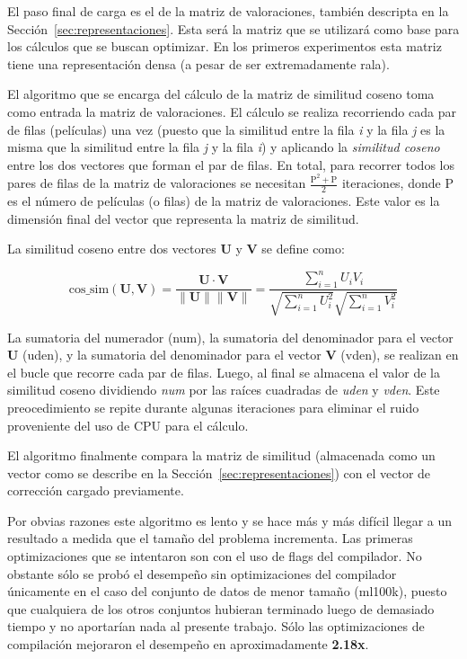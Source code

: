 \documentclass[11pt, a4paper]{article}
\begin{document}
  El paso final de carga es el de la matriz de valoraciones, también descripta
  en la Sección~\ref{sec:representaciones}.  Esta será la matriz que se
  utilizará como base para los cálculos que se buscan optimizar. En los
  primeros experimentos esta matriz tiene una representación densa (a pesar de
  ser extremadamente rala).

  El algoritmo que se encarga del cálculo de la matriz de similitud coseno toma
  como entrada la matriz de valoraciones. El cálculo se realiza recorriendo
  cada par de filas (películas) una vez (puesto que la similitud entre la fila
  {\em i} y la fila {\em j} es la misma que la similitud entre la fila {\em j}
  y la fila {\em i}) y aplicando la {\em similitud coseno} entre los dos
  vectores que forman el par de filas.  En total, para recorrer todos los pares
  de filas de la matriz de valoraciones se necesitan
  $\frac{\text{P}^2+\text{P}}{2}$ iteraciones, donde P es el número de
  películas (o filas) de la matriz de valoraciones. Este valor es la dimensión
  final del vector que representa la matriz de similitud.

  La similitud coseno entre dos vectores \textbf{U} y \textbf{V} se define
  como:

  \[
      \text{cos\_sim}(\mathbf{U}, \mathbf{V}) = {\frac{\mathbf{U}\cdot\mathbf{V}}{\|\mathbf{U}\|\|\mathbf{V}\|}} = 
      {\frac {\sum \limits _{i=1}^{n}{U_{i}V_{i}}}{{\sqrt {\sum \limits _{i=1}^{n}{U_{i}^{2}}}}
      {\sqrt {\sum \limits _{i=1}^{n}{V_{i}^{2}}}}}}
  \]

  La sumatoria del numerador (num), la sumatoria del denominador para el vector
  \textbf{U} (uden), y la sumatoria del denominador para el vector \textbf{V}
  (vden), se realizan en el bucle que recorre cada par de filas. Luego, al
  final se almacena el valor de la similitud coseno dividiendo {\em num} por
  las raíces cuadradas de {\em uden} y {\em vden}. Este preocedimiento se
  repite durante algunas iteraciones para eliminar el ruido proveniente del uso
  de CPU para el cálculo. 

  El algoritmo finalmente compara la matriz de similitud (almacenada como un
  vector como se describe en la Sección~\ref{sec:representaciones}) con el
  vector de corrección cargado previamente.

  Por obvias razones este algoritmo es lento y se hace más y más difícil llegar
  a un resultado a medida que el tamaño del problema incrementa. Las primeras
  optimizaciones que se intentaron son con el uso de flags del compilador. No
  obstante sólo se probó el desempeño sin optimizaciones del compilador
  únicamente en el caso del conjunto de datos de menor tamaño (ml100k), puesto
  que cualquiera de los otros conjuntos hubieran terminado luego de demasiado
  tiempo y no aportarían nada al presente trabajo. Sólo las optimizaciones de
  compilación mejoraron el desempeño en aproximadamente {\bf 2.18x}.
\end{document}
